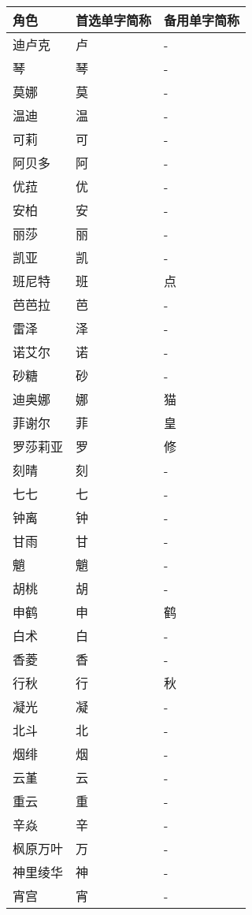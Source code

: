 \begin{longtabu}{|X[2c]|X[c]|X[c]|}
	\hline
	{角色} & {首选单字简称} & {备用单字简称} \\
	\hline
	\endhead
	\hline
	\endfoot
	{迪卢克} & {卢} & {-} \\
	{琴} & {琴} & {-} \\
	{莫娜} & {莫} & {-} \\
	{温迪} & {温} & {-} \\
	{可莉} & {可} & {-} \\
	{阿贝多} & {阿} & {-} \\
	{优菈} & {优} & {-} \\
	\hline
	{安柏} & {安} & {-} \\
	{丽莎} & {丽} & {-} \\
	{凯亚} & {凯} & {-} \\
	{班尼特} & {班} & {点} \\
	{芭芭拉} & {芭} & {-} \\
	{雷泽} & {泽} & {-} \\
	{诺艾尔} & {诺} & {-} \\
	{砂糖} & {砂} & {-} \\
	{迪奥娜} & {娜} & {猫} \\
	{菲谢尔} & {菲} & {皇} \\
	{罗莎莉亚} & {罗} & {修} \\
	\hline
	{刻晴} & {刻} & {-} \\
	{七七} & {七} & {-} \\
	{钟离} & {钟} & {-} \\
	{甘雨} & {甘} & {-} \\
	{魈} & {魈} & {-} \\
	{胡桃} & {胡} & {-} \\
	{申鹤} & {申} & {鹤} \\
	{白术} & {白} & {-} \\
	\hline
	{香菱} & {香} & {-} \\
	{行秋} & {行} & {秋} \\
	{凝光} & {凝} & {-} \\
	{北斗} & {北} & {-} \\
	{烟绯} & {烟} & {-} \\
	{云堇} & {云} & {-} \\
	{重云} & {重} & {-} \\
	{辛焱} & {辛} & {-} \\
	\hline
	{枫原万叶} & {万} & {-} \\
	{神里绫华} & {神} & {-} \\
	{宵宫} & {宵} & {-} \\

\end{longtabu}
